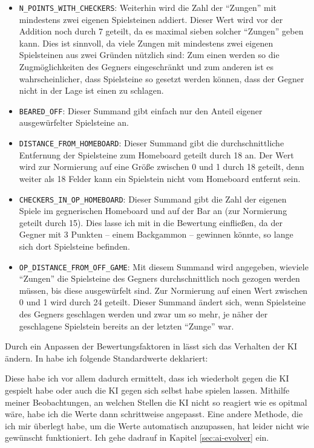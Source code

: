 \begin{itemize}
  \item \lstinline$N_POINTS_WITH_CHECKERS$: Weiterhin wird die Zahl der "`Zungen"' mit mindestens zwei eigenen Spielsteinen addiert. Dieser Wert wird vor der Addition noch durch 7 geteilt, da es maximal sieben solcher "`Zungen"' geben kann. Dies ist sinnvoll, da viele Zungen mit mindestens zwei eigenen Spielsteinen aus zwei Gründen nützlich sind: Zum einen werden so die Zugmöglichkeiten des Gegners eingeschränkt und zum anderen ist es wahrscheinlicher, dass Spielsteine so gesetzt werden können, dass der Gegner nicht in der Lage ist einen zu schlagen.
  \item \lstinline$BEARED_OFF$: Dieser Summand gibt einfach nur den Anteil eigener ausgewürfelter Spielsteine an.
  \item \lstinline$DISTANCE_FROM_HOMEBOARD$: Dieser Summand gibt die durchschnittliche Entfernung der Spielsteine zum Homeboard geteilt durch 18 an. Der Wert wird zur Normierung auf eine Größe zwischen 0 und 1 durch 18 geteilt, denn weiter als 18 Felder kann ein Spielstein nicht vom Homeboard entfernt sein.
  \item \lstinline$CHECKERS_IN_OP_HOMEBOARD$: Dieser Summand gibt die Zahl der eigenen Spiele im gegnerischen Homeboard und auf der Bar an (zur Normierung geteilt durch 15). Dies lasse ich mit in die Bewertung einfließen, da der Gegner mit 3 Punkten -- einem Backgammon -- gewinnen könnte, so lange sich dort Spielsteine befinden.
  \item \lstinline$OP_DISTANCE_FROM_OFF_GAME$: Mit diesem Summand wird angegeben, wieviele "`Zungen"' die Spielsteine des Gegners durchschnittlich noch gezogen werden müssen, bis diese ausgewürfelt sind. Zur Normierung auf einen Wert zwischen 0 und 1 wird durch 24 geteilt. Dieser Summand ändert sich, wenn Spielsteine des Gegners geschlagen werden und zwar um so mehr, je näher der geschlagene Spielstein bereits an der letzten "`Zunge"' war.
\end{itemize}

Durch ein Anpassen der Bewertungsfaktoren in  lässt sich das Verhalten der KI ändern. In  habe ich folgende Standardwerte deklariert:

Diese habe ich vor allem dadurch ermittelt, dass ich wiederholt gegen die KI gespielt habe oder auch die KI gegen sich selbst habe spielen lassen. Mithilfe meiner Beobachtungen, an welchen Stellen die KI nicht so reagiert wie es opitmal wäre, habe ich die Werte dann schrittweise angepasst. Eine andere Methode, die ich mir überlegt habe, um die Werte automatisch anzupassen, hat leider nicht wie gewünscht funktioniert. Ich gehe dadrauf in Kapitel \ref{sec:ai-evolver} ein.

